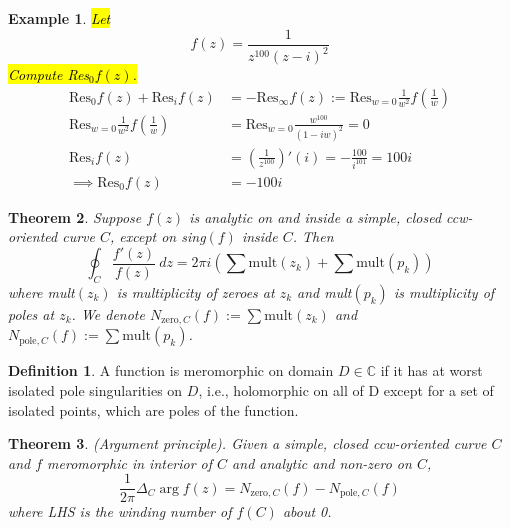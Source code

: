 \documentclass{article}
\newtheorem{theorem}{Theorem}[section]
\newtheorem{example}[theorem]{Example}
\theoremstyle{definition}
\newtheorem{definition}{Definition}[section]
\begin{document}
\begin{example} \normalfont
    \hl{Let}
    \begin{equation*}
        f(z) = \frac{1}{z^{100}(z-i)^2}
    \end{equation*}
    \hl{Compute Res$_0f(z)$.}
    \begin{align*}
        \text{Res}_0 f(z) + \text{Res}_i f(z) &= -\text{Res}_\infty f(z) := \text{Res}_{w=0} \frac{1}{w^2} f\left(\frac{1}{w}\right) \\
        \text{Res}_{w=0} \frac{1}{w^2} f\left(\frac{1}{w}\right) &= \text{Res}_{w=0} \frac{w^{100}}{(1-iw)^2} = 0 \\
        \text{Res}_i f(z) &= \left(\frac{1}{z^{100}}\right)' (i) = -\frac{100}{i^{101}} = 100i \\
        \implies \text{Res}_0 f(z) &= -100i
    \end{align*}
\end{example}

\begin{theorem} \normalfont
    Suppose $f(z)$ is analytic on and inside a simple, closed ccw-oriented curve $C$, except on sing$(f)$ inside $C$. Then
    \begin{equation*}
        \oint_C \frac{f'(z)}{f(z)}\ dz = 2 \pi i \left( \sum \text{mult}(z_k) + \sum \text{mult}(p_k) \right)
    \end{equation*}
    where mult$(z_k)$ is multiplicity of zeroes at $z_k$ and mult$(p_k)$ is multiplicity of poles at $z_k$. We denote $N_{\text{zero}, C}(f) := \sum \text{mult}(z_k)$ and $N_{\text{pole}, C}(f) := \sum \text{mult} (p_k)$.
\end{theorem}

\begin{definition}
    A function is meromorphic on domain $D \in \mathbb{C}$ if it has at worst isolated pole singularities on $D$, i.e., holomorphic on all of D except for a set of isolated points, which are poles of the function.
\end{definition}

\begin{theorem} \normalfont
    (Argument principle). Given a simple, closed ccw-oriented curve $C$ and $f$ meromorphic in interior of $C$ and analytic and non-zero on $C$,
    \begin{equation*}
        \frac{1}{2 \pi} \Delta_C \arg f(z) = N_{\text{zero}, C}(f) - N_{\text{pole}, C}(f)
    \end{equation*}
    where LHS is the winding number of $f(C)$ about 0.
\end{theorem}
\end{document}
